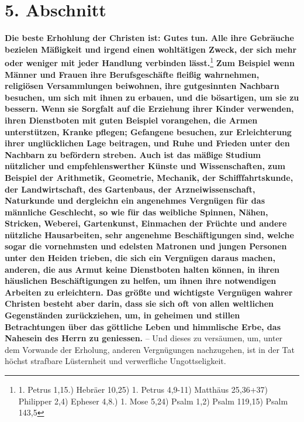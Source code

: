 \section{5. Abschnitt} \label{kap15_ab5}

\label{ref:15_05_freizeitbeschaeftigung}
\textbf{Die beste Erhohlung der Christen ist: Gutes tun. Alle ihre Gebräuche
bezielen
Mäßigkeit und irgend einen wohltätigen Zweck, der sich mehr oder weniger mit
jeder Handlung verbinden lässt.}\footnote{1. Petrus 1,15.) Hebräer 10,25) 1.
Petrus 4,9-11)
Matthäus 25,36+37) Philipper 2,4) Epheser 4,8.) 1. Mose 5,24) Psalm 1,2) Psalm
119,15) Psalm 143,5}
\textbf{Zum Beispiel wenn Männer und Frauen ihre
Berufsgeschäfte fleißig
wahrnehmen,
religiösen Versammlungen beiwohnen, ihre gutgesinnten Nachbarn
besuchen, um sich
mit ihnen zu erbauen, und die bösartigen, um sie zu bessern. Wenn sie Sorgfalt
auf die Erziehung ihrer Kinder
verwenden, ihren
Dienstboten mit guten Beispiel
vorangehen, die Armen unterstützen, Kranke pflegen;
Gefangene
besuchen, zur
Erleichterung ihrer unglücklichen Lage beitragen, und Ruhe und Frieden unter den
Nachbarn zu befördern streben. Auch ist das mäßige
Studium nützlicher und
empfehlenswerther Künste und
Wissenschaften, zum Beispiel
der Arithmetik,
Geometrie,
Mechanik, der
Schifffahrtskunde,
der Landwirtschaft, des
Gartenbaus, der
Arzneiwissenschaft, Naturkunde und dergleichn ein
angenehmes Vergnügen für
das männliche Geschlecht, so wie für das weibliche
Spinnen, Nähen, Stricken,
Weberei, Gartenkunst, Einmachen der Früchte und andere nützliche
Hausarbeiten,
sehr angenehme Beschäftigungen sind, welche sogar die vornehmsten und edelsten
Matronen und jungen Personen unter den Heiden trieben, die sich ein Vergnügen
daraus machen, anderen, die aus Armut keine Dienstboten halten können, in ihren
häuslichen Beschäftigungen zu helfen, um ihnen ihre notwendigen Arbeiten zu
erleichtern. Das größte und wichtigste Vergnügen wahrer Christen besteht aber
darin, dass sie sich oft von allen weltlichen Gegenständen zurückziehen, um, in
geheimen und stillen Betrachtungen über das
göttliche Leben und himmlische Erbe,
das Nahesein des Herrn zu geniessen.} -- Und dieses zu versäumen, um, unter dem
Vorwande der Erholung, anderen Vergnügungen nachzugehen, ist in der Tat höchst
strafbare Lüsternheit und verwerfliche Ungottseligkeit.

